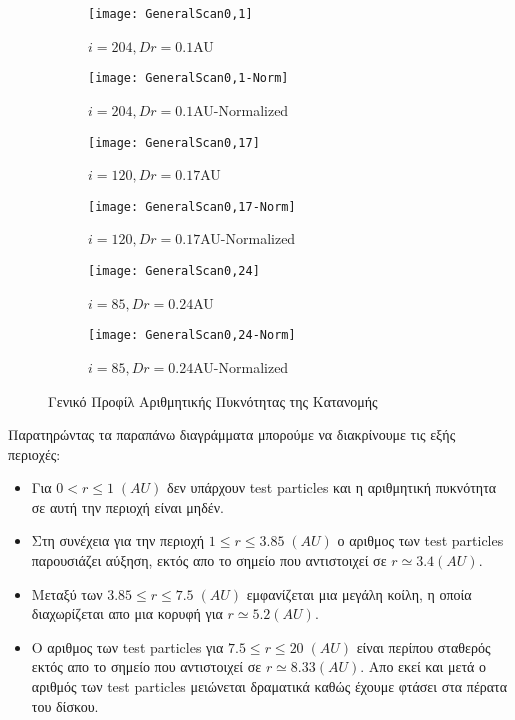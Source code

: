 \begin{figure}[h] 
 \begin{subfigure}{0.48\textwidth}
  \texttt{[image: GeneralScan0,1]}
  \caption{$i=204,Dr=0.1${\en AU}}\label{i204,Dr0.1}
 \end{subfigure}\hspace*{\fill}
 \begin{subfigure}{0.48\textwidth}
  \texttt{[image: GeneralScan0,1-Norm]}
  \caption{$i=204,Dr=0.1${\en AU-Normalized}}\label{i204,Dr0.1 Norm}
 \end{subfigure}
 \medskip
  
 \begin{subfigure}{0.48\textwidth}
  \texttt{[image: GeneralScan0,17]}
  \caption{$i=120,Dr=0.17${\en AU}}\label{i120,Dr0.17}
 \end{subfigure}\hspace*{\fill}
 \begin{subfigure}{0.48\textwidth}
  \texttt{[image: GeneralScan0,17-Norm]}
  \caption{$i=120,Dr=0.17${\en AU-Normalized}}\label{i120,Dr0.17 Norm}
 \end{subfigure}
 \medskip
 
  \begin{subfigure}{0.48\textwidth}
   \texttt{[image: GeneralScan0,24]}
   \caption{$i=85,Dr=0.24${\en AU}}\label{i85,Dr0.24}
  \end{subfigure}\hspace*{\fill}
  \begin{subfigure}{0.48\textwidth}
   \texttt{[image: GeneralScan0,24-Norm]}
   \caption{$i=85,Dr=0.24${\en AU-Normalized}}\label{i85,Dr0.24 Norm}
  \end{subfigure}
 \caption{Γενικό Προφίλ Αριθμητικής Πυκνότητας της Κατανομής}
\end{figure}   
 
 Παρατηρώντας τα παραπάνω διαγράμματα μπορούμε να διακρίνουμε τις εξής περιοχές:
\begin{itemize}

 \item Για $0<r \leq 1 \; (AU)$ δεν υπάρχουν {\en test particles} και η αριθμητική πυκνότητα σε αυτή την περιοχή είναι μηδέν. 
 \item Στη συνέχεια για την περιοχή $1 \leq r \leq 3.85 \; (AU)$  ο αριθμος των {\en test particles} παρουσιάζει αύξηση, εκτός απο το σημείο που αντιστοιχεί σε  $r \simeq 3.4 (AU)$. 
 \item Μεταξύ των $3.85 \leq r \leq 7.5 \; (AU)$ εμφανίζεται μια μεγάλη κοίλη, η οποία διαχωρίζεται απο μια κορυφή για $r \simeq 5.2 (AU)$.
 \item O αριθμος των {\en test particles} για $ 7.5 \leq r \leq 20 \; (AU)$ είναι περίπου σταθερός εκτός απο το σημείο που αντιστοιχεί σε  $r \simeq 8.33 (AU)$. Απο εκεί και μετά ο αριθμός των {\en test particles} μειώνεται δραματικά καθώς έχουμε φτάσει στα πέρατα του δίσκου.
  
\end{itemize} 

